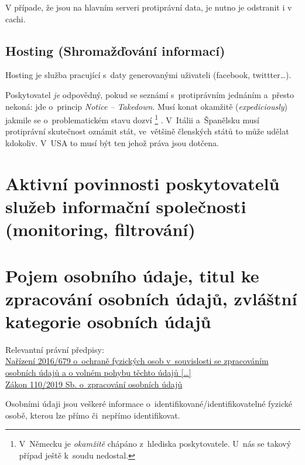 V případe, že jsou na hlavním serveri protiprávní data, je nutno je odstranit i v cachi.

\subsection{Hosting (Shromažďování informací)}

Hosting je služba pracující s~daty generovanými uživateli (facebook, twittter\dots).

Poskytovatel \emph{je} odpovědný, pokud se seznámí s~protiprávním jednáním a~přesto nekoná: jde o~princip \emph{Notice -- Takedown}.
Musí konat okamžitě (\emph{expediciously}) jakmile se o~problematickém stavu dozví%
\footnote{
	V~Německu je \emph{okamžitě} chápáno z~hlediska poskytovatele.
	U~nás se takový případ ještě k~soudu nedostal.
}%
.
V~Itálii a~Španělsku musí protiprávní skutečnost oznámit stát, ve~většině členských států to může udělat kdokoliv.
V~USA to musí být ten jehož práva jsou dotčena.


\clearpage
\section{Aktivní povinnosti poskytovatelů služeb informační společnosti (monitoring, filtrování)}

\clearpage
\section{Pojem osobního údaje, titul ke zpracování osobních údajů, zvláštní kategorie osobních údajů}

{}Relevantní právní předpisy:
\\\href{https://eur-lex.europa.eu/legal-content/CS/ALL/?uri=CELEX:32016R0679
}{Nařízení 2016/679 o~ochraně fyzických osob v~souvislosti se zpracováním osobních údajů a o volném pohybu těchto údajů [\dots]}
\\\href{https://www.zakonyprolidi.cz/cs/2019-110}{Zákon 110/2019 Sb. o~zpracování osobních údajů}

Osobními údaji jsou veškeré informace o~identifikované/identifikovatelné fyzické osobě, kterou lze přímo či~nepřímo identifikovat.

